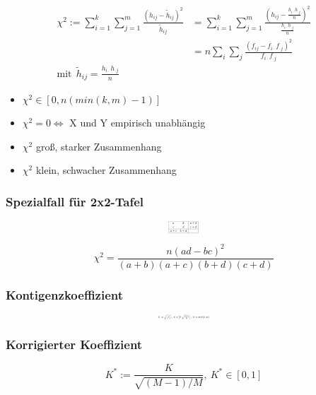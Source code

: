 \documentclass[10pt,a4paper,landscape]{article}
\begin{document}
\begin{multicols}{4}
{\tiny
\begin{align*}
\chi^2 := \sum_{i=1}^k \sum_{j=1}^m \frac{(h_{ij}-\tilde{h}_{ij})^2}{\tilde{h}_{ij}}&=\sum_{i=1}^k \sum_{j=1}^m \frac{(h_{ij}-\frac{h_{i\cdot}h_{\cdot j}}{n})^2}{\frac{h_{i\cdot}h_{\cdot j}}{n}} \\
&=  n\sum_{i} \sum_{j}\frac{(f_{ij}-f_{i\cdot}f_{\cdot j})^2}{f_{i\cdot}f_{\cdot j}} \\
\text{mit}~~ \tilde{h}_{ij}=\frac{h_{i\cdot}h_{\cdot j}}{n}
\end{align*}
}

\begin{itemize}
\item $\chi^2 \in [0, n(min(k,m)-1)]$
\item $\chi^2=0 \Leftrightarrow$ X und Y empirisch unabhängig
\item $\chi^2$ groß, starker Zusammenhang
\item $\chi^2$ klein, schwacher Zusammenhang
\end{itemize}

\subsubsection*{Spezialfall für 2x2-Tafel}
\[ \resizebox{0.09\textwidth}{!}{$
\begin{array}{|cc|c|}
\hline
a & b & a+b \\
c & d & c+d \\
\hline
a+c & b+d & \\
\hline
\end{array}
$}
\]

\[
\chi^2 = \frac{n(ad-bc)^2}{(a+b)(a+c)(b+d)(c+d)}
\]

\subsubsection*{Kontigenzkoeffizient}
\[ \resizebox{0.15\textwidth}{!}{$
K := \sqrt{\frac{\chi^2}{n+\chi^2}}, ~K \in \left[0, \sqrt{\frac{M-1}{M}}\right],~ M=min\{k, m\}
$}
\]

\subsubsection*{Korrigierter Koeffizient}
\[
K^* := \frac{K}{\sqrt{(M-1)/M}}, ~ K^* \in [0, 1]
\]



\end{multicols}
\end{document}

